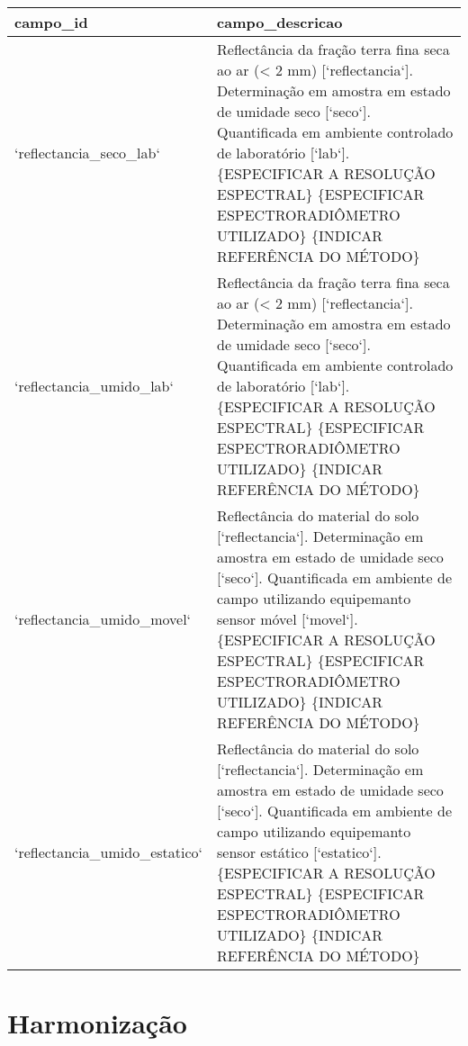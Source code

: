 \documentclass[
]{book}
\begin{document}
\begin{tabular}{l|l}
\hline
campo\_id & campo\_descricao\\
\hline
`reflectancia\_seco\_lab` & Reflectância da fração terra fina seca ao ar (< 2 mm) [`reflectancia`]. Determinação em amostra em estado de umidade seco [`seco`]. Quantificada em ambiente controlado de laboratório [`lab`]. \{ESPECIFICAR A RESOLUÇÃO ESPECTRAL\} \{ESPECIFICAR ESPECTRORADIÔMETRO UTILIZADO\} \{INDICAR REFERÊNCIA DO MÉTODO\}\\
\hline
`reflectancia\_umido\_lab` & Reflectância da fração terra fina seca ao ar (< 2 mm) [`reflectancia`]. Determinação em amostra em estado de umidade seco [`seco`]. Quantificada em ambiente controlado de laboratório [`lab`]. \{ESPECIFICAR A RESOLUÇÃO ESPECTRAL\} \{ESPECIFICAR ESPECTRORADIÔMETRO UTILIZADO\} \{INDICAR REFERÊNCIA DO MÉTODO\}\\
\hline
`reflectancia\_umido\_movel` & Reflectância do material do solo [`reflectancia`]. Determinação em amostra em estado de umidade seco [`seco`]. Quantificada em ambiente de campo utilizando equipemanto sensor móvel [`movel`]. \{ESPECIFICAR A RESOLUÇÃO ESPECTRAL\} \{ESPECIFICAR ESPECTRORADIÔMETRO UTILIZADO\} \{INDICAR REFERÊNCIA DO MÉTODO\}\\
\hline
`reflectancia\_umido\_estatico` & Reflectância do material do solo [`reflectancia`]. Determinação em amostra em estado de umidade seco [`seco`]. Quantificada em ambiente de campo utilizando equipemanto sensor estático [`estatico`]. \{ESPECIFICAR A RESOLUÇÃO ESPECTRAL\} \{ESPECIFICAR ESPECTRORADIÔMETRO UTILIZADO\} \{INDICAR REFERÊNCIA DO MÉTODO\}\\
\hline
\end{tabular}

\hypertarget{harmonizauxe7uxe3o-1}{%
\section{Harmonização}\label{harmonizauxe7uxe3o-1}}

  
\end{document}
